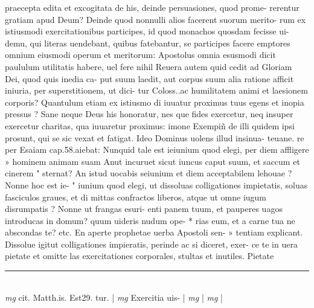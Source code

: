 \documentclass{article}
\begin{document}
\begin{pages}
praecepta edita et excogitata de his, deinde persuasiones, quod prome- rerentur gratiam apud Deum? Deinde quod nonnulli alios facerent suorum merito- rum ex istiusmodi exercitationibus participes, id quod monachos quosdam fecisse ui- demu, qui literas uendebant, quibus fatebantur, se participes facere emptores omnium eiusmodi operum et meritorum: Apostolus omnia esusmodi dicit paululum utilitatis habere, uel fere nihil Reuera autem quid cedit ad Gloriam Dei, quod quis inedia ca- put suum laedit, aut corpus suum alia ratione afficit iniuria, per superstitionem, ut dici- tur Coloss..ac humilitatem animi et laesionem corporis? Quantulum etiam ex istiusmo di iuuatur proximus tuus egens et inopia pressus ? Sane neque Deus his honoratur, nes que fides exercetur, neq insuper exercetur charitas, qua iuuaretur proximus: imone Exempiñ de illi quidem ipsi prosunt, qui se sic vexat et fatigat. Ideo Dominus uolens illud insinua- teuane. re per Esaiam cap.58.aiebat: Nunquid tale est ieiunium quod elegi, per diem affligere » hominem animam suam Anut incuruet sicut iuncus caput suum, et saccum et cinerem " sternat? An istud uocabis seiunium et diem acceptabilem lehouae ? Nonne hoc est ie- " iunium quod elegi, ut dissoluas colligationes impietatis, soluas fasciculos graues, et di  mittas confractos liberos, atque ut omne iugum disrumpatis ? Nonne ut frangas esuri-  enti panem tuum, et pauperes uagos introducas in domum? quum uideris nudum ope- * rias eum, et a carne tua ne abscondas te? etc. En aperte prophetae uerba Apostoli sen- » tentiam explicant. Dissolue igitut colligationes impieratis, perinde ac si diceret, exer- ce te in uera pietate et omitte las exercitationes corporales, stultas et inutiles. Pietate  \pend
\vspace{0.5cm}\noindent
\vspace{0.2cm}\rule{1cm}{0.2pt}\\ 
\hspace{0.2cm}\textit{mg}
\footnotesize cit. Matth.is. Est29. tur. 
\normalsize| 
\hspace{0.2cm}\textit{mg}
\footnotesize Exercitia uis- 
\normalsize| 
\hspace{0.2cm}\textit{mg}
\footnotesize 
\normalsize| 
\hspace{0.2cm}\textit{mg}
\footnotesize 
\normalsize| 

\end{pages}
\end{document}
